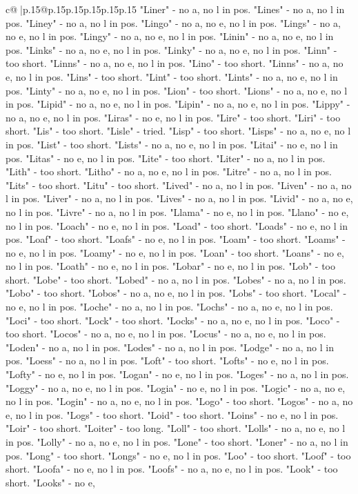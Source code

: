 \documentclass{article}
\begin{document}
{\begin{supertabular}{c@{$\;$}|p{.15\linewidth}@{}p{.15\linewidth}p{.15\linewidth}p{.15\linewidth}p{.15\linewidth}p{.15\linewidth}}
{{{"Liner" {-} no a, no l in pos. "Lines" {-} no a, no l in pos. "Liney" {-} no a, no l in pos. "Lingo" {-} no a, no e, no l in pos. "Lings" {-} no a, no e, no l in pos. "Lingy" {-} no a, no e, no l in pos. "Linin" {-} no a, no e, no l in pos. "Links" {-} no a, no e, no l in pos. "Linky" {-} no a, no e, no l in pos. "Linn" {-} too short. "Linns" {-} no a, no e, no l in pos. "Lino" {-} too short. "Linns" {-} no a, no e, no l in pos. "Lins" {-} too short. "Lint" {-} too short. "Lints" {-} no a, no e, no l in pos. "Linty" {-} no a, no e, no l in pos. "Lion" {-} too short. "Lions" {-} no a, no e, no l in pos. "Lipid" {-} no a, no e, no l in pos. "Lipin" {-} no a, no e, no l in pos. "Lippy" {-} no a, no e, no l in pos. "Liras" {-} no e, no l in pos. "Lire" {-} too short. "Liri" {-} too short. "Lis" {-} too short. "Lisle" {-} tried. "Lisp" {-} too short. "Lisps" {-} no a, no e, no l in pos. "List" {-} too short. "Lists" {-} no a, no e, no l in pos. "Litai" {-} no e, no l in pos. "Litas" {-} no e, no l in pos. "Lite" {-} too short. "Liter" {-} no a, no l in pos. "Lith" {-} too short. "Litho" {-} no a, no e, no l in pos. "Litre" {-} no a, no l in pos. "Lits" {-} too short. "Litu" {-} too short. "Lived" {-} no a, no l in pos. "Liven" {-} no a, no l in pos. "Liver" {-} no a, no l in pos. "Lives" {-} no a, no l in pos. "Livid" {-} no a, no e, no l in pos. "Livre" {-} no a, no l in pos. "Llama" {-} no e, no l in pos. "Llano" {-} no e, no l in pos. "Loach" {-} no e, no l in pos. "Load" {-} too short. "Loads" {-} no e, no l in pos. "Loaf" {-} too short. "Loafs" {-} no e, no l in pos. "Loam" {-} too short. "Loams" {-} no e, no l in pos. "Loamy" {-} no e, no l in pos. "Loan" {-} too short. "Loans" {-} no e, no l in pos. "Loath" {-} no e, no l in pos. "Lobar" {-} no e, no l in pos. "Lob" {-} too short. "Lobe" {-} too short. "Lobed" {-} no a, no l in pos. "Lobes" {-} no a, no l in pos. "Lobo" {-} too short. "Lobos" {-} no a, no e, no l in pos. "Lobs" {-} too short. "Local" {-} no e, no l in pos. "Loche" {-} no a, no l in pos. "Lochs" {-} no a, no e, no l in pos. "Loci" {-} too short. "Lock" {-} too short. "Locks" {-} no a, no e, no l in pos. "Loco" {-} too short. "Locos" {-} no a, no e, no l in pos. "Locus" {-} no a, no e, no l in pos. "Loden" {-} no a, no l in pos. "Lodes" {-} no a, no l in pos. "Lodge" {-} no a, no l in pos. "Loess" {-} no a, no l in pos. "Loft" {-} too short. "Lofts" {-} no e, no l in pos. "Lofty" {-} no e, no l in pos. "Logan" {-} no e, no l in pos. "Loges" {-} no a, no l in pos. "Loggy" {-} no a, no e, no l in pos. "Logia" {-} no e, no l in pos. "Logic" {-} no a, no e, no l in pos. "Login" {-} no a, no e, no l in pos. "Logo" {-} too short. "Logos" {-} no a, no e, no l in pos. "Logs" {-} too short. "Loid" {-} too short. "Loins" {-} no e, no l in pos. "Loir" {-} too short. "Loiter" {-} too long. "Loll" {-} too short. "Lolls" {-} no a, no e, no l in pos. "Lolly" {-} no a, no e, no l in pos. "Lone" {-} too short. "Loner" {-} no a, no l in pos. "Long" {-} too short. "Longs" {-} no e, no l in pos. "Loo" {-} too short. "Loof" {-} too short. "Loofa" {-} no e, no l in pos. "Loofs" {-} no a, no e, no l in pos. "Look" {-} too short. "Looks" {-} no e, }}}
\end{supertabular}}
\end{document}

